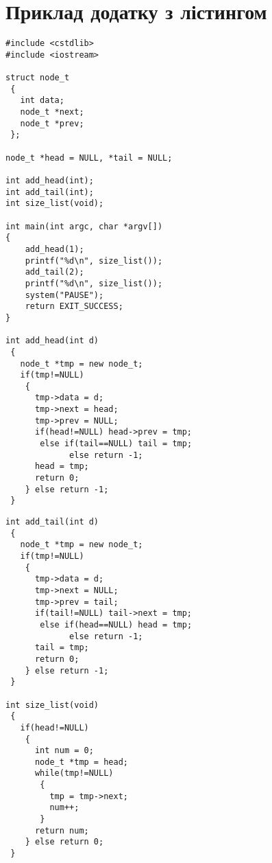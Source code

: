 \chapter[(Довідковий) Приклад додатку з лістингом]{Приклад додатку з лістингом}

%    
%    
%
%                
%                
%    

{\underonespace
\begin{verbatim}
#include <cstdlib>
#include <iostream>

struct node_t
 {
   int data;
   node_t *next;
   node_t *prev;    
 };

node_t *head = NULL, *tail = NULL; 

int add_head(int);
int add_tail(int);
int size_list(void);

int main(int argc, char *argv[])
{
    add_head(1);
    printf("%d\n", size_list());
    add_tail(2);
    printf("%d\n", size_list());
    system("PAUSE");
    return EXIT_SUCCESS;
}

int add_head(int d)
 {
   node_t *tmp = new node_t;
   if(tmp!=NULL)
    {
      tmp->data = d;
      tmp->next = head;
      tmp->prev = NULL;
      if(head!=NULL) head->prev = tmp;
       else if(tail==NULL) tail = tmp;
             else return -1;
      head = tmp;
      return 0;          
    } else return -1;
 }

\end{verbatim}}

\clearpage

{\underonespace
\begin{verbatim}
int add_tail(int d)
 {
   node_t *tmp = new node_t;
   if(tmp!=NULL)
    {
      tmp->data = d;
      tmp->next = NULL;
      tmp->prev = tail;
      if(tail!=NULL) tail->next = tmp;
       else if(head==NULL) head = tmp;
             else return -1;
      tail = tmp;
      return 0;          
    } else return -1;             
 }

int size_list(void)
 {
   if(head!=NULL)
    {
      int num = 0;           
      node_t *tmp = head;
      while(tmp!=NULL)
       {
         tmp = tmp->next;
         num++;            
       }
      return num;            
    } else return 0;
 }
\end{verbatim}}
